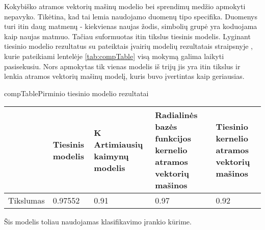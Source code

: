 
Kokybiško atramos vektorių mašinų modelio bei sprendimų medžio apmokyti nepavyko. Tikėtina, kad tai lemia naudojamo duomenų tipo specifika. Duomenys turi itin daug matmenų - kiekvienas naujas žodis, simbolių grupė yra koduojama kaip naujas matmuo. Tačiau suformuotas itin tikslus tiesinis modelis. Lyginant tiesinio modelio rezultatus su pateiktais įvairių modelių rezultatais straipsnyje \cite{comp}, kurie pateikiami lentelėje \vref{tab:compTable} visą mokymą galima laikyti pasisekusiu. Nors apmokytas tik vienas modelis iš trijų jis yra itin tikslus ir lenkia atramos vektorių mašinų modelį, kuris buvo įvertintas kaip geriausias.

\begin{ktutable}{compTable}{Pirminio tiesinio modelio rezultatai}
    \begin{tabular}{|l|p{3cm}|p{3cm}|p{3cm}|p{3cm}|}
    \hline
                             & Tiesinis modelis  &  K Artimiausių kaimynų modelis  &  Radialinės bazės funkcijos kernelio atramos vektorių mašinos  &  Tiesinio kernelio atramos vektorių mašinos               \\ \hline
               Tikslumas     & 0.97552           & 0.91   & 0.97  &  0.92         \\ \hline
    \end{tabular}
\end{ktutable}

Šis modelis toliau naudojamas klasifikavimo įrankio kūrime.